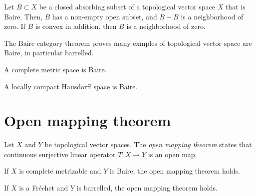 \documentclass{../../large}
\begin{document}
\begin{prb}
Let $B\subset X$ be a closed absorbing subset of a topological vector space $X$ that is Baire.
Then, $B$ has a non-empty open subset, and $B-B$ is a neighborhood of zero.
If $B$ is convex in addition, then $B$ is a neighborhood of zero.
\end{prb}


\begin{prb}
The Baire category theorem proves many exmples of topological vector space are Baire, in particular barrelled.
\begin{parts}
\item A complete metric space is Baire.
\item A locally compact Hausdorff space is Baire.
\end{parts}
\end{prb}




\section{Open mapping theorem}

\begin{prb}
Let $X$ and $Y$ be topological vector spaces.
The \emph{open mapping theorem} states that continuous surjective linear operator $T:X\to Y$ is an open map.
\begin{parts}
\item If $X$ is complete metrizable and $Y$ is Baire, the open mapping theorem holds.
\item If $X$ is a Fr\'echet and $Y$ is barrelled, the open mapping theorem holds.
\end{parts}
\end{prb}
\end{document}
